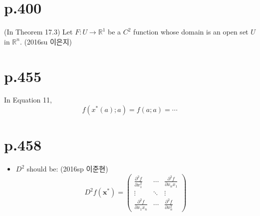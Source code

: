 \documentclass[a4paper]{article}
\begin{document}
\section{p.400} %
\label{sec:p_400}
(In Theorem 17.3) Let $F:U\rightarrow \mathbb{R}^1$ be a $C^2$ function whose domain is an open set $U$ in $\mathbb{R}^n$.
(2016su 이은지)

\section{p.455} %
\label{sec:p_455}
In Equation 11, \[
	f(x^\ast(a);a)=f(a;a)= \cdots
\]

\section{p.458} %
\label{sec:p_458}

\begin{itemize}
	\item $D^2$ should be: (2016sp 이준현)
	\[
		D^2 f(\mathbf{x^\ast}) = \begin{pmatrix}
			\frac{\partial^2 f}{\partial x_1^2} & \cdots & \frac{\partial^2 f}{\partial x_nx_1}\\
			\vdots & \ddots & \vdots \\
			\frac{\partial^2 f}{\partial x_1x_n} & \cdots & \frac{\partial^2 f}{\partial x_n^2}
		\end{pmatrix}
	\]
\end{itemize}

\end{document}
